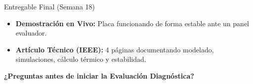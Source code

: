 \documentclass[aspectratio=169]{beamer}
\begin{document}
\begin{frame}{Entregable Final (Semana 18)}
    \begin{itemize}
        \item \textbf{Demostración en Vivo:} Placa funcionando de forma estable ante un panel evaluador.
        \item \textbf{Artículo Técnico (IEEE):} 4 páginas documentando modelado, simulaciones, cálculo térmico y estabilidad.
    \end{itemize}
    \vspace{0.5cm}
    \begin{center}
        \textbf{¿Preguntas antes de iniciar la Evaluación Diagnóstica?}
    \end{center}
\end{frame}
\end{document}
